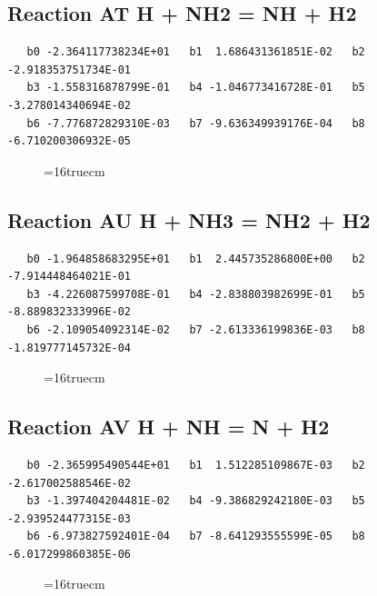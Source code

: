 \documentclass[12pt,dvipdfm]{article}
\begin{document}
\subsection{
Reaction AT H + NH2 = NH + H2 }
\begin{small}\begin{verbatim}
   b0 -2.364117738234E+01   b1  1.686431361851E-02   b2 -2.918353751734E-01
   b3 -1.558316878799E-01   b4 -1.046773416728E-01   b5 -3.278014340694E-02
   b6 -7.776872829310E-03   b7 -9.636349939176E-04   b8 -6.710200306932E-05
\end{verbatim}\end{small}
\begin{figure}[h!] \label{n2rates}
\epsfxsize=16truecm
\end{figure}
\newpage

\subsection{
Reaction AU H + NH3 = NH2 + H2 }
\begin{small}\begin{verbatim}
   b0 -1.964858683295E+01   b1  2.445735286800E+00   b2 -7.914448464021E-01
   b3 -4.226087599708E-01   b4 -2.838803982699E-01   b5 -8.889832333996E-02
   b6 -2.109054092314E-02   b7 -2.613336199836E-03   b8 -1.819777145732E-04
\end{verbatim}\end{small}
\begin{figure}[h!] \label{n2rates}
\epsfxsize=16truecm
\end{figure}
\newpage

\subsection{
Reaction AV H + NH = N + H2 }
\begin{small}\begin{verbatim}
   b0 -2.365995490544E+01   b1  1.512285109867E-03   b2 -2.617002588546E-02
   b3 -1.397404204481E-02   b4 -9.386829242180E-03   b5 -2.939524477315E-03
   b6 -6.973827592401E-04   b7 -8.641293555599E-05   b8 -6.017299860385E-06
\end{verbatim}\end{small}
\begin{figure}[h!] \label{n2rates}
\epsfxsize=16truecm
\end{figure}
\newpage
\end{document}
